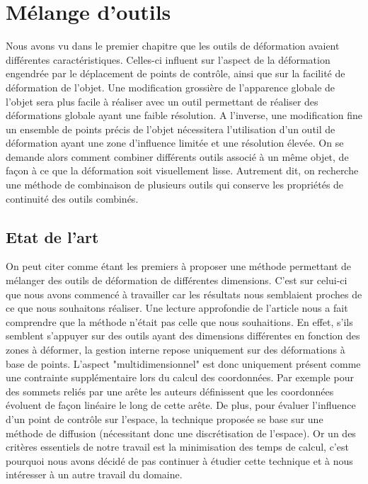 

\chapter{Mélange d'outils}

\graphicspath{ {Chapter3/Chapter3Figs/PNG/}
  {Chapter3/Chapter3Figs/PDF/} {Chapter3/Chapter3Figs/} }

Nous avons vu dans le premier chapitre que les outils de déformation avaient
différentes caractéristiques. Celles-ci influent sur l'aspect de la déformation
engendrée par le déplacement de points de contrôle, ainsi que sur la facilité de
déformation de l'objet. Une modification grossière de l'apparence globale de
l'objet sera plus facile à réaliser avec un outil permettant de réaliser des
déformations globale ayant une faible résolution. A l'inverse, une modification
fine un ensemble de points précis de l'objet nécessitera l'utilisation d'un
outil de déformation ayant une zone d'influence limitée et une résolution
élevée. On se demande alors comment combiner différents outils associé à un même
objet, de façon à ce que la déformation soit visuellement lisse. Autrement dit,
on recherche une méthode de combinaison de plusieurs outils qui conserve les
propriétés de continuité des outils combinés.

\section{Etat de l'art}

On peut citer \cite{JBPS11} comme étant les premiers à proposer une méthode
permettant de mélanger des outils de déformation de différentes dimensions.
C'est sur celui-ci que nous avons commencé à travailler car les résultats nous
semblaient proches de ce que nous souhaitons réaliser. Une lecture approfondie
de l'article nous a fait comprendre que la méthode n'était pas celle que nous
souhaitions. En effet, s'ils semblent s'appuyer sur des outils ayant des
dimensions différentes en fonction des zones à déformer, la gestion interne
repose uniquement sur des déformations à base de points. L'aspect
"multidimensionnel" est donc uniquement présent comme une contrainte
supplémentaire lors du calcul des coordonnées. Par exemple pour des sommets
reliés par une arête les auteurs définissent que les coordonnées évoluent de
façon linéaire le long de cette arête. De plus, pour évaluer l'influence d'un
point de contrôle sur l'espace, la technique proposée se base sur une méthode de
diffusion (nécessitant donc une discrétisation de l'espace). Or un des critères
essentiels de notre travail est la minimisation des temps de calcul, c'est
pourquoi nous avons décidé de pas continuer à étudier cette technique et à nous
intéresser à un autre travail du domaine.

